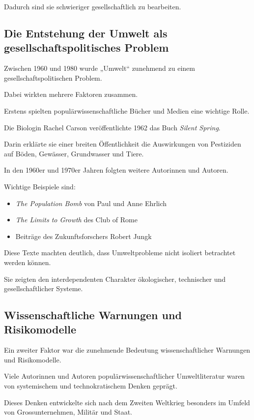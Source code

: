 Dadurch sind sie schwieriger
gesellschaftlich zu bearbeiten.

\subsection{Die Entstehung der Umwelt als gesellschaftspolitisches Problem}

Zwischen 1960 und 1980
wurde „Umwelt“ zunehmend
zu einem gesellschaftspolitischen Problem.

Dabei wirkten mehrere Faktoren zusammen.

Erstens spielten populärwissenschaftliche Bücher
und Medien eine wichtige Rolle.

Die Biologin Rachel Carson veröffentlichte 1962
das Buch \emph{Silent Spring}.

Darin erklärte sie einer breiten Öffentlichkeit
die Auswirkungen von Pestiziden
auf Böden,
Gewässer,
Grundwasser
und Tiere.

In den 1960er und 1970er Jahren
folgten weitere Autorinnen und Autoren.

Wichtige Beispiele sind:

\begin{itemize}
\item \emph{The Population Bomb} von Paul und Anne Ehrlich
\item \emph{The Limits to Growth} des Club of Rome
\item Beiträge des Zukunftsforschers Robert Jungk
\end{itemize}

Diese Texte machten deutlich,
dass Umweltprobleme
nicht isoliert betrachtet werden können.

Sie zeigten den interdependenten Charakter
ökologischer,
technischer
und gesellschaftlicher Systeme.

\subsection{Wissenschaftliche Warnungen und Risikomodelle}

Ein zweiter Faktor war die zunehmende Bedeutung
wissenschaftlicher Warnungen
und Risikomodelle.

Viele Autorinnen und Autoren
populärwissenschaftlicher Umweltliteratur
waren von systemischem
und technokratischem Denken geprägt.

Dieses Denken entwickelte sich
nach dem Zweiten Weltkrieg
besonders im Umfeld von Grossunternehmen,
Militär und Staat.

